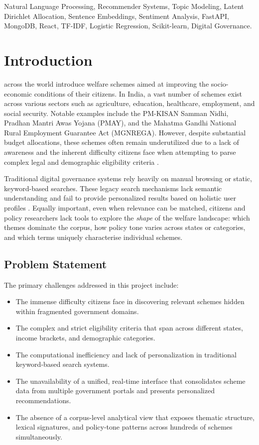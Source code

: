 \documentclass[10pt, journal, twocolumn]{IEEEtran}
\begin{document}
\begin{IEEEkeywords}
Natural Language Processing, Recommender Systems, Topic Modeling, Latent Dirichlet Allocation, Sentence Embeddings, Sentiment Analysis, FastAPI, MongoDB, React, TF-IDF, Logistic Regression, Scikit-learn, Digital Governance.
\end{IEEEkeywords}

\section{Introduction}
 across the world introduce welfare schemes aimed at improving the socio-economic conditions of their citizens. In India, a vast number of schemes exist across various sectors such as agriculture, education, healthcare, employment, and social security. Notable examples include the PM-KISAN Samman Nidhi, Pradhan Mantri Awas Yojana (PMAY), and the Mahatma Gandhi National Rural Employment Guarantee Act (MGNREGA). However, despite substantial budget allocations, these schemes often remain underutilized due to a lack of awareness and the inherent difficulty citizens face when attempting to parse complex legal and demographic eligibility criteria \cite{ricci2015}.

Traditional digital governance systems rely heavily on manual browsing or static, keyword-based searches. These legacy search mechanisms lack semantic understanding and fail to provide personalized results based on holistic user profiles \cite{manning2008}. Equally important, even when relevance can be matched, citizens and policy researchers lack tools to explore the \emph{shape} of the welfare landscape: which themes dominate the corpus, how policy tone varies across states or categories, and which terms uniquely characterise individual schemes.

\subsection{Problem Statement}
The primary challenges addressed in this project include:
\begin{itemize}
    \item The immense difficulty citizens face in discovering relevant schemes hidden within fragmented government domains.
    \item The complex and strict eligibility criteria that span across different states, income brackets, and demographic categories.
    \item The computational inefficiency and lack of personalization in traditional keyword-based search systems.
    \item The unavailability of a unified, real-time interface that consolidates scheme data from multiple government portals and presents personalized recommendations.
    \item The absence of a corpus-level analytical view that exposes thematic structure, lexical signatures, and policy-tone patterns across hundreds of schemes simultaneously.
\end{itemize}
\end{document}
